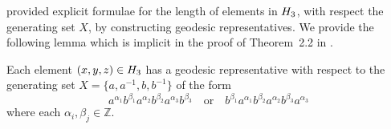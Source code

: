 \Textcite[Theorem~2.2]{blachere2003} provided explicit formulae for the length of elements in $H_3$, with respect the generating set $X$, by constructing geodesic representatives.
We provide the following lemma which is implicit in the proof of Theorem~2.2 in \cite{blachere2003}.

\begin{lemma}\label{lem:heisenberg-geodesic}
	Each element $(x,y,z) \in H_3$ has a geodesic representative with respect to the generating set $X = \{a,a^{-1},b,b^{-1}\}$ of the form
	\[
		a^{\alpha_1}
		b^{\beta_1}
		a^{\alpha_2}
		b^{\beta_2}
		a^{\alpha_3}
		b^{\beta_3}
	\quad
	\mathrm{or}
	\quad
		b^{\beta_1}
		a^{\alpha_1}
		b^{\beta_2}
		a^{\alpha_2}
		b^{\beta_3}
		a^{\alpha_3}
	\]
	where each $\alpha_i,\beta_j \in \mathbb{Z}$.
\end{lemma}

